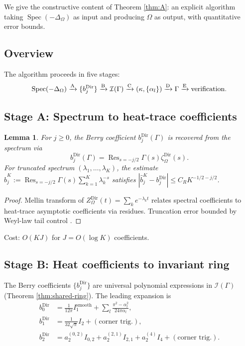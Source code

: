 \documentclass[11pt,reqno]{amsart}
\theoremstyle{plain}
\newtheorem{lemma}[theorem]{Lemma}
\theoremstyle{definition}
\theoremstyle{remark}
\DeclareMathOperator{\Spec}{Spec}
\DeclareMathOperator{\Res}{Res}
\newcommand{\Icalbb}{\mathcal{I}}
\begin{document}
We give the constructive content of Theorem \ref{thm:A}: an explicit algorithm taking $\Spec(-\Delta_\Omega)$ as input and producing $\Omega$ as output, with quantitative error bounds.

\subsection{Overview}\label{ss:algorithm-overview}

The algorithm proceeds in five stages:
\[
\Spec(-\Delta_\Omega) \xrightarrow{\rm A} \{b_j^{\mathrm{Dir}}\} \xrightarrow{\rm B} \Icalbb(\Gamma) \xrightarrow{\rm C} (\kappa, \{\alpha_l\}) \xrightarrow{\rm D} \Gamma \xrightarrow{\rm E} \text{verification}.
\]

\subsection{Stage A: Spectrum to heat-trace coefficients}\label{sec:stage-A}

\begin{lemma}\label{lem:mellin-master}
For $j \geq 0$, the Berry coefficient $b_j^{\mathrm{Dir}}(\Gamma)$ is recovered from the spectrum via
\[
b_j^{\mathrm{Dir}}(\Gamma) = \Res_{s = -j/2}\Gamma(s)\zeta_\Omega^{\mathrm{Dir}}(s).
\]
For truncated spectrum $(\lambda_1, \dots, \lambda_K)$, the estimate $\widehat b_j^{K} := \Res_{s=-j/2}\Gamma(s)\sum_{k=1}^K\lambda_k^{-s}$ satisfies $|\widehat b_j^K - b_j^{\mathrm{Dir}}| \leq C_R K^{-1/2 - j/2}$.
\end{lemma}

\begin{proof}
Mellin transform of $Z_\Omega^{\mathrm{Dir}}(t) = \sum_k e^{-\lambda_k t}$ relates spectral coefficients to heat-trace asymptotic coefficients via residues. Truncation error bounded by Weyl-law tail control \cite[\S 4]{GulatiReconstruction}.
\end{proof}

Cost: $O(KJ)$ for $J = O(\log K)$ coefficients.

\subsection{Stage B: Heat coefficients to invariant ring}\label{sec:stage-B}

The Berry coefficients $\{b_j^{\mathrm{Dir}}\}$ are universal polynomial expressions in $\Icalbb(\Gamma)$ (Theorem \ref{thm:shared-ring}). The leading expansion is
\begin{align*}
b_0^{\mathrm{Dir}} &= \frac{1}{12\pi}I_1^{\mathrm{smooth}} + \sum_l \frac{\pi^2 - \alpha_l^2}{24\pi\alpha_l},\\
b_1^{\mathrm{Dir}} &= \frac{1}{32\sqrt\pi}I_2 + (\text{corner trig.}),\\
b_2^{\mathrm{Dir}} &= a_2^{(0,2)} I_{0,2} + a_2^{(2,1)} I_{2,1} + a_2^{(4)} I_4 + (\text{corner trig.}).
\end{align*}
\end{document}
